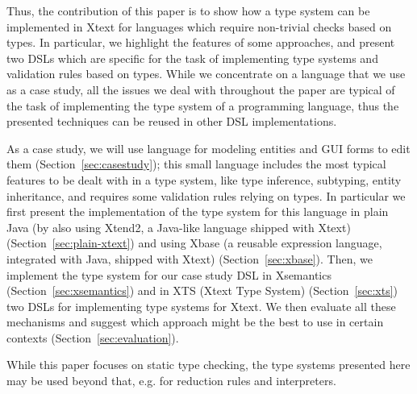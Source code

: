 
Thus, the contribution of this paper is to show how a type system can be
implemented in Xtext for languages  which require non-trivial checks based on types. In particular, we
highlight the features of some approaches, and present two DSLs which are
specific for the task of implementing type systems and validation rules based on
types.   While we concentrate on a language that we use as a case study, all the
issues we deal with throughout the paper are typical of the task of implementing
the type system of a programming language, thus the presented techniques can be
reused in other DSL implementations. 

As a case study, we will use language for modeling entities and GUI forms to
edit them (Section~\ref{sec:casestudy}); this small language includes the most
typical features to be dealt with in a type system, like type inference,
subtyping, entity inheritance, and requires some validation rules relying on
types.  In particular we first present the implementation of the type system for
this language in plain Java (by also using Xtend2, a Java-like language shipped
with Xtext) (Section~\ref{sec:plain-xtext}) and using Xbase (a reusable
expression language, integrated with Java, shipped with Xtext)
(Section~\ref{sec:xbase}). 
Then, we implement the type system for our case study DSL in Xsemantics
(Section~\ref{sec:xsemantics}) and in XTS (Xtext Type System)
(Section~\ref{sec:xts}) two DSLs for implementing type systems for Xtext.
We then evaluate all these mechanisms and suggest which approach might be the
best to use in certain contexts (Section~\ref{sec:evaluation}).

While this paper focuses on static type checking, the type systems presented
here may be used beyond that, e.g. for reduction rules and interpreters.  


